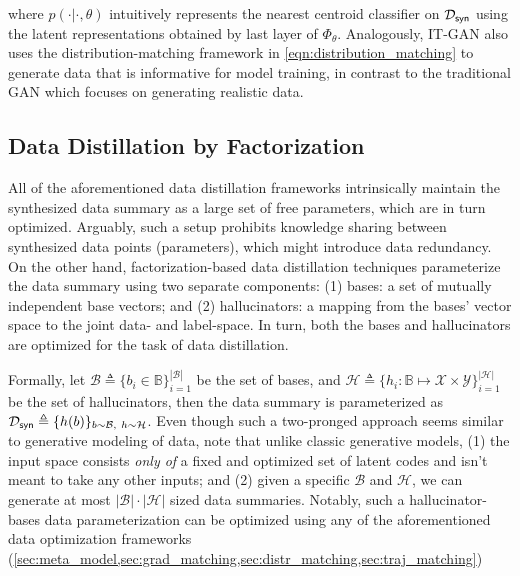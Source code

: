\documentclass[10pt]{article} %
\begin{document}
where $\hat{p}(\cdot|\cdot, \theta)$ intuitively represents the nearest centroid classifier on $\mathcal{D}_{\mathsf{syn}}$ using the latent representations obtained by last layer of $\Phi_\theta$. Analogously, IT-GAN \citep{gan_distillation} also uses the distribution-matching framework in \cref{eqn:distribution_matching} to generate data that is informative for model training, in contrast to the traditional GAN \citep{gan} which focuses on generating realistic data.



\subsection{Data Distillation by Factorization} \label{sec:dd_factorization}
All of the aforementioned data distillation frameworks intrinsically maintain the synthesized data summary as a large set of free parameters, which are in turn optimized. Arguably, such a setup prohibits knowledge sharing between synthesized data points (parameters), which might introduce data redundancy. On the other hand, factorization-based data distillation techniques parameterize the data summary using two separate components: (1) bases: a set of mutually independent base vectors; and (2) hallucinators: a mapping from the bases' vector space to the joint data- and label-space. In turn, both the bases and hallucinators are optimized for the task of data distillation. 

Formally, let $\mathcal{B} \triangleq \{b_i \in \mathbb{B}\}_{i=1}^{|\mathcal{B}|}$ be the set of bases, and $\mathcal{H} \triangleq \{h_i : \mathbb{B} \mapsto \mathcal{X} \times \mathcal{Y} \}_{i=1}^{|\mathcal{H}|}$ be the set of hallucinators, then the data summary is parameterized as $\mathcal{D}_{\mathsf{syn}} \triangleq \{ {h(b)} \}_{b\sim \mathcal{B}, ~ h\sim \mathcal{H}}$. Even though such a two-pronged approach seems similar to generative modeling of data, note that unlike classic generative models, (1) the input space consists \emph{only of} a fixed and optimized set of latent codes and isn't meant to take any other inputs; and (2) given a specific $\mathcal{B}$ and $\mathcal{H}$, we can generate at most $|\mathcal{B}|\cdot|\mathcal{H}|$ sized data summaries. Notably, such a hallucinator-bases data parameterization can be optimized using any of the aforementioned data optimization frameworks (\cref{sec:meta_model,sec:grad_matching,sec:distr_matching,sec:traj_matching})
\end{document}

